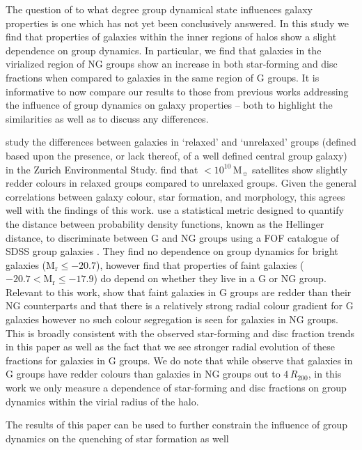 \documentclass[a4paper,fleqn,usenatbib]{mnras}
\newcommand{\Msun}{\,\mathrm{M_{\sun}}}
\begin{document}
The question of to what degree group dynamical state influences galaxy
properties is one which has not yet been conclusively answered.  In
this study we find that properties of galaxies within the inner
regions of halos show a slight dependence on group dynamics.  In
particular, we find that galaxies in the virialized region of NG
groups show an increase in both star-forming and disc fractions
when compared to galaxies in the same region of G groups.  It is
informative to now compare our results to those from previous 
works addressing the influence of group dynamics on galaxy properties
-- both to highlight the similarities as well as to discuss any
differences.
\par
\citet{carollo2013} study the differences between galaxies in
`relaxed' and `unrelaxed' groups (defined based upon the presence, or
lack thereof, of a well defined central group galaxy) in the Zurich
Environmental Study.  \citet{carollo2013} find that $<10^{10}\Msun$
satellites show slightly redder colours in relaxed groups compared to
unrelaxed groups.  Given the general correlations between galaxy colour, star
formation, and morphology, this agrees well with the findings of this
work. \citet{ribeiro2013} use a statistical metric designed to quantify the
distance between probability density functions, known as the Hellinger
distance, to discriminate between G and NG groups using a
FOF catalogue of SDSS group galaxies
\citep{berlind2006}.  They find no dependence on group dynamics for
bright galaxies ($\mathrm{M_r} \le -20.7$), however find that
properties of faint galaxies ($-20.7 < \mathrm{M_r} \le -17.9$) do
depend on whether they live in a G or NG group.  Relevant to this
work, \citet{ribeiro2013} show that faint galaxies in G groups are
redder than their NG counterparts and that there is a relatively
strong radial colour gradient for G galaxies however no such colour
segregation is seen for galaxies in NG groups.  This is broadly
consistent with the observed star-forming and disc fraction trends in
this paper as well as the fact that we see stronger radial evolution
of these fractions for galaxies in G groups.  We do note that while
\citet{ribeiro2010} observe that galaxies in G groups have redder
colours than galaxies in NG groups out to $4\,R_{200}$, in this work
we only measure a dependence of star-forming and disc fractions on
group dynamics within the virial radius of the halo.
\par
The results of this paper can be used to further constrain the
influence of group dynamics on the quenching of star formation as well
\end{document}

